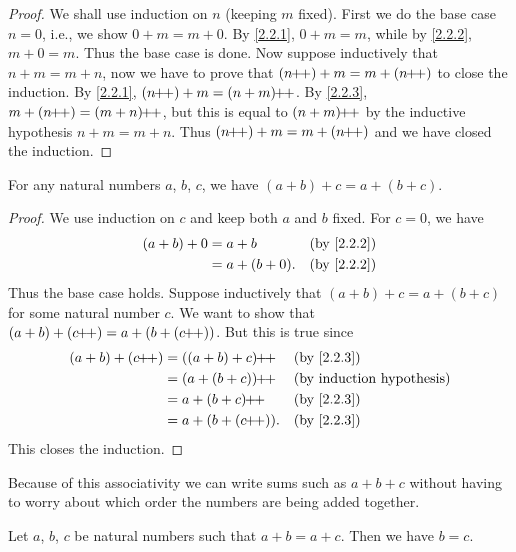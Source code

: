 \begin{proof}
  We shall use induction on \(n\) (keeping \(m\) fixed).
  First we do the base case \(n = 0\), i.e., we show \(0 + m = m + 0\).
  By \cref{2.2.1}, \(0 + m = m\), while by \cref{2.2.2}, \(m + 0 = m\).
  Thus the base case is done.
  Now suppose inductively that \(n + m = m + n\), now we have to prove that \((n\pp) + m = m + (n\pp)\) to close the induction.
  By \cref{2.2.1}, \((n\pp) + m = (n + m)\pp\).
  By \cref{2.2.3}, \(m + (n\pp) = (m + n)\pp\), but this is equal to \((n + m)\!\!+\!\!+\) by the inductive hypothesis \(n+m=m+n\).
  Thus \((n\pp) + m = m + (n\pp)\) and we have closed the induction.
\end{proof}

\begin{prop}\label{2.2.5}
  For any natural numbers \(a\), \(b\), \(c\), we have \((a + b) + c = a + (b + c)\).
\end{prop}

\begin{proof}
  We use induction on \(c\) and keep both \(a\) and \(b\) fixed.
  For \(c = 0\), we have
  \begin{align*}
    (a + b) + 0 & = a + b        &  & \by{2.2.2} \\
                & = a + (b + 0). &  & \by{2.2.2}
  \end{align*}
  Thus the base case holds.
  Suppose inductively that \((a + b) + c = a + (b + c)\) for some natural number \(c\).
  We want to show that \((a + b) + (c\pp) = a + (b + (c\pp))\).
  But this is true since
  \begin{align*}
    (a + b) + (c\pp) & = ((a + b) + c)\pp  &  & \by{2.2.3} \\
                     & = (a + (b + c))\pp  &  & \byIH      \\
                     & = a + (b + c)\pp    &  & \by{2.2.3} \\
                     & = a + (b + (c\pp)). &  & \by{2.2.3}
  \end{align*}
  This closes the induction.
\end{proof}

\begin{note}
  Because of this associativity we can write sums such as \(a + b + c\) without having to worry about which order the numbers are being added together.
\end{note}

\begin{prop}\label{2.2.6}
  Let \(a\), \(b\), \(c\) be natural numbers such that \(a + b = a + c\).
  Then we have \(b = c\).
\end{prop}

